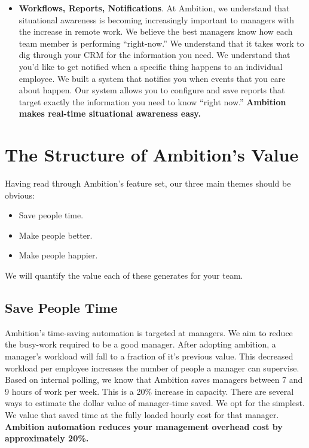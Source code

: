 \documentclass[paper=a4, fontsize=11pt abstract]{scrartcl}
\numberwithin{equation}{section}		%
\numberwithin{figure}{section}			%
\numberwithin{table}{section}				%
\begin{document}
\begin{itemize}
   \item \textbf{Workflows, Reports, Notifications}.
   At Ambition, we understand that situational awareness is becoming increasingly important to managers with the increase in remote work.
   We believe the best managers know how each team member is performing ``right-now.''
   We understand that it takes work to dig through your CRM for the information you need.
   We understand that you'd like to get notified when a specific thing happens to an individual employee.
   We built a system that notifies you when events that you care about happen.
   Our system allows you to configure and save reports that target exactly the information you need to know ``right now.''
   \textbf{Ambition makes real-time situational awareness easy.} 
    
\end{itemize}

\section{The Structure of Ambition's Value}
Having read through Ambition's feature set, our three main themes should be obvious:
\begin{itemize}
    \item Save people time.
    \item Make people better.
    \item Make people happier.
\end{itemize}

We will quantify the value each of these generates for your team.

\subsection{Save People Time}
Ambition's time-saving automation is targeted at managers.
We aim to reduce the busy-work required to be a good manager.
After adopting ambition, a manager's workload will fall to a fraction of it's previous value.
This decreased workload per employee increases the number of people a manager can supervise.
Based on internal polling, we know that Ambition saves managers between 7 and 9 hours of work per week.
This is a 20\% increase in capacity.
There are several ways to estimate the dollar value of manager-time saved.
We opt for the simplest.
We value that saved time at the fully loaded hourly cost for that manager.
\textbf{Ambition automation reduces your management overhead cost by approximately 20\%.}
\end{document}
